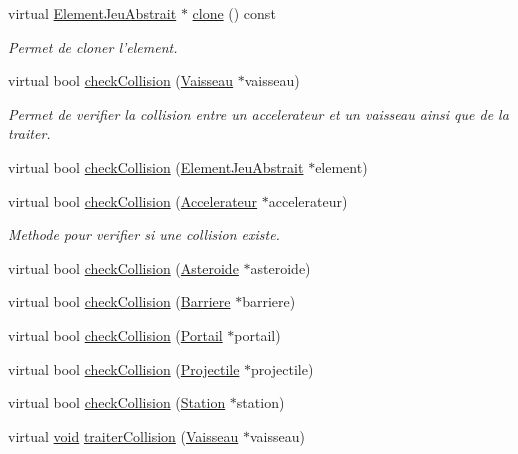 \begin{DoxyCompactItemize}
virtual \hyperlink{class_element_jeu_abstrait}{Element\-Jeu\-Abstrait} $\ast$ \hyperlink{group__inf2990_ga56f704dcb76a319389d98488226e2b55}{clone} () const 
\begin{DoxyCompactList}\small\item\em Permet de cloner l'element. \end{DoxyCompactList}\item 
virtual bool \hyperlink{group__inf2990_gadae7daa610394fcc68cdfc663e464595}{check\-Collision} (\hyperlink{class_vaisseau}{Vaisseau} $\ast$vaisseau)
\begin{DoxyCompactList}\small\item\em Permet de verifier la collision entre un accelerateur et un vaisseau ainsi que de la traiter. \end{DoxyCompactList}\item 
virtual bool \hyperlink{group__inf2990_ga5a2f46d23dac6e1999aaf918609c58fa}{check\-Collision} (\hyperlink{class_element_jeu_abstrait}{Element\-Jeu\-Abstrait} $\ast$element)
\item 
virtual bool \hyperlink{class_accelerateur_a508a92e1d984eeae57f1bbdd84c84322}{check\-Collision} (\hyperlink{class_accelerateur}{Accelerateur} $\ast$accelerateur)
\begin{DoxyCompactList}\small\item\em Methode pour verifier si une collision existe. \end{DoxyCompactList}\item 
virtual bool \hyperlink{class_accelerateur_aa85ee233f8bc86cf6c826acc0580e0a2}{check\-Collision} (\hyperlink{class_asteroide}{Asteroide} $\ast$asteroide)
\item 
virtual bool \hyperlink{class_accelerateur_a869783e0782c83f7eea473b618b14220}{check\-Collision} (\hyperlink{class_barriere}{Barriere} $\ast$barriere)
\item 
virtual bool \hyperlink{class_accelerateur_ab61bf9baed0ba9963341ca3d8fbf1c60}{check\-Collision} (\hyperlink{class_portail}{Portail} $\ast$portail)
\item 
virtual bool \hyperlink{class_accelerateur_ac7e350f65c76b6d5afdb3f42212e32f5}{check\-Collision} (\hyperlink{class_projectile}{Projectile} $\ast$projectile)
\item 
virtual bool \hyperlink{class_accelerateur_aeb1f74adbddbddf58d2dc09c8f6c2e34}{check\-Collision} (\hyperlink{class_station}{Station} $\ast$station)
\item 
virtual \hyperlink{wglew_8h_aeea6e3dfae3acf232096f57d2d57f084}{void} \hyperlink{group__inf2990_ga6a95509f0fcb19be7475a4a5474583a4}{traiter\-Collision} (\hyperlink{class_vaisseau}{Vaisseau} $\ast$vaisseau)

\end{DoxyCompactItemize}
